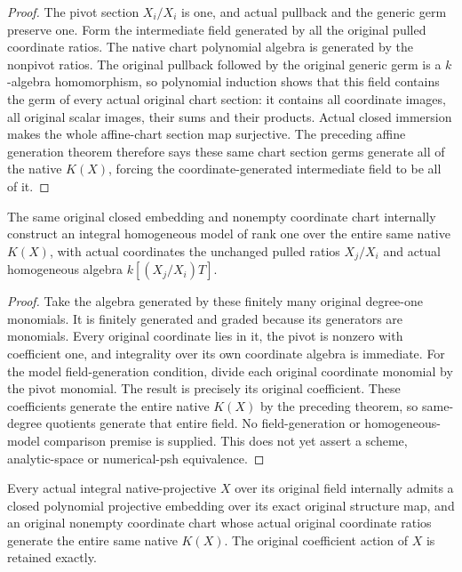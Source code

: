 \begin{proof}
The pivot section $X_i/X_i$ is one, and actual pullback and
the generic germ preserve one. Form the intermediate field
generated by all the original pulled coordinate ratios.
The native chart polynomial algebra is generated by the
nonpivot ratios. The original pullback followed by the
original generic germ is a $k$-algebra homomorphism, so
polynomial induction shows that this field contains the
germ of every actual original chart section: it contains
all coordinate images, all original scalar images, their
sums and their products. Actual closed immersion makes the
whole affine-chart section map surjective. The preceding
affine generation theorem therefore says these same chart
section germs generate all of the native $K(X)$, forcing
the coordinate-generated intermediate field to be all of it.
\end{proof}

\begin{theorem}
\label{thm:projective-chart-whole-native-field-model}
\leanok
{}
The same original closed embedding and nonempty coordinate
chart internally construct an integral homogeneous model
of rank one over the entire same native $K(X)$, with actual
coordinates the unchanged pulled ratios $X_j/X_i$ and
actual homogeneous algebra $k[(X_j/X_i)T]$.
\end{theorem}

\begin{proof}
Take the algebra generated by these finitely many original
degree-one monomials. It is finitely generated and graded
because its generators are monomials. Every original
coordinate lies in it, the pivot is nonzero with coefficient
one, and integrality over its own coordinate algebra is
immediate. For the model field-generation condition, divide
each original coordinate monomial by the pivot monomial.
The result is precisely its original coefficient. These
coefficients generate the entire native $K(X)$ by the
preceding theorem, so same-degree quotients generate that
entire field. No field-generation or homogeneous-model
comparison premise is supplied. This does not yet assert
a scheme, analytic-space or numerical-psh equivalence.
\end{proof}

\begin{theorem}
\label{thm:native-projective-whole-field-coordinates}
\leanok
{}
Every actual integral native-projective $X$ over its original
field internally admits a closed polynomial projective
embedding over its exact original structure map, and an
original nonempty coordinate chart whose actual original
coordinate ratios generate the entire same native $K(X)$.
The original coefficient action of $X$ is retained exactly.
\end{theorem}

